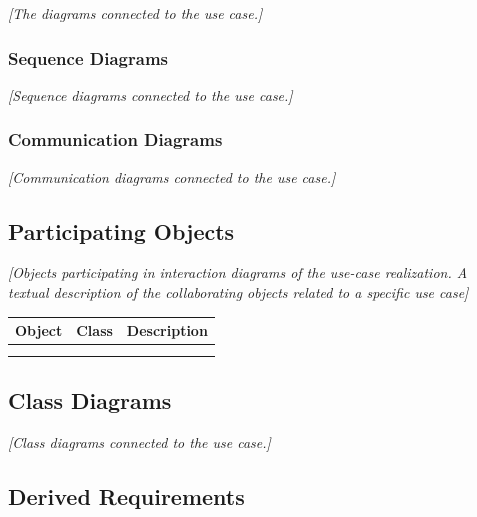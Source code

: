 \documentclass[12pt, a4paper, titlepage]{article}
\begin{document}
{\color{blue}\textit{[The diagrams connected to the use case.]}}

\subsubsection{Sequence Diagrams}  

{\color{blue}\textit{[Sequence diagrams connected to the use case.]}}

\subsubsection{Communication Diagrams}  

{\color{blue}\textit{[Communication diagrams connected to the use case.]}}

\subsection{Participating Objects}

{\color{blue}\textit{[Objects participating in interaction diagrams of the use-case realization.  A textual description of the collaborating objects related to a specific use case]}} \\

\begin{tabular}{|p{3cm}|p{3cm}|p{9cm}|}
\hline Object & Class & Description \\ 
\hline  &  &  \\ 
\hline  &  &  \\ 
\hline 
\end{tabular} 

\subsection{Class Diagrams}

{\color{blue}\textit{[Class diagrams connected to the use case.]}}

\subsection{Derived Requirements}
\end{document}
